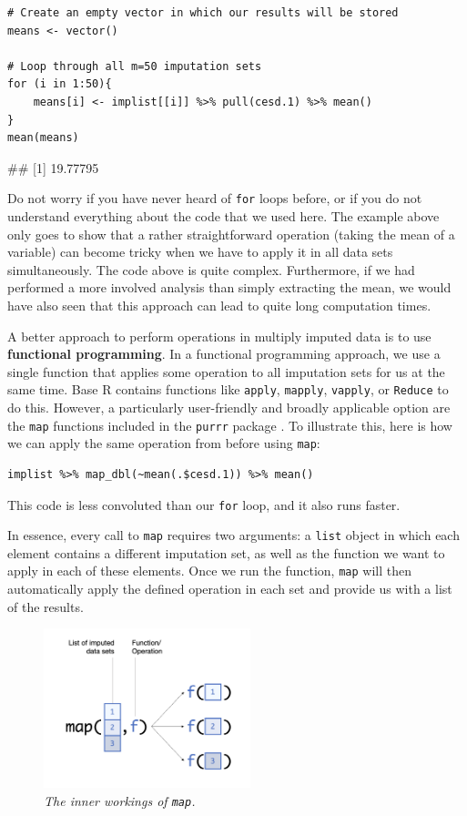 \begin{lstlisting}
# Create an empty vector in which our results will be stored
means <- vector()

# Loop through all m=50 imputation sets
for (i in 1:50){
    means[i] <- implist[[i]] %>% pull(cesd.1) %>% mean()
}
mean(means)
\end{lstlisting}
\begin{example}
## [1] 19.77795
\end{example}

Do not worry if you have never heard of \texttt{for} loops before, or if you do not understand everything about the code that we used here. The example above only goes to show that a rather straightforward operation (taking the mean of a variable) can become tricky when we have to apply it in all data sets simultaneously. The code above is quite complex. Furthermore, if we had performed a more involved analysis than simply extracting the mean, we would have also seen that this approach can lead to quite long computation times. 

A better approach to perform operations in multiply imputed data is to use \textbf{functional programming}. In a functional programming approach, we use a single function that applies some operation to all imputation sets for us at the same time. Base \textsf{R} contains functions like \texttt{apply}, \texttt{mapply}, \texttt{vapply}, or \texttt{Reduce} to do this. However, a particularly user-friendly and broadly applicable option are the \texttt{map} functions included in the \texttt{purrr} package \citep{purrr}. To illustrate this, here is how we can apply the same operation from before using \texttt{map}:

\begin{lstlisting}
implist %>% map_dbl(~mean(.$cesd.1)) %>% mean()
\end{lstlisting}

This code is less convoluted than our \texttt{for} loop, and it also runs faster. 

In essence, every call to \texttt{map} requires two arguments: a \texttt{list} object in which each element contains a different imputation set, as well as the function we want to apply in each of these elements. Once we run the function, \texttt{map} will then automatically apply the defined operation in each set and provide us with a list of the results.

\begin{figure}[t]
\includegraphics[width=6cm]{images/purrr.png}
\captionsetup{labelformat=empty} 
\centering
\caption{\emph{The inner workings of \texttt{map}.}}
\end{figure}

